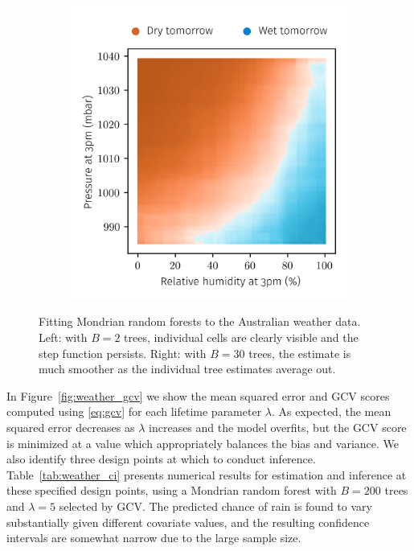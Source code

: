 \begin{figure}[ht]
\begin{subfigure}{0.49\textwidth}
    \includegraphics[scale=0.8]{graphics/weather_forest_30.png}%
  \end{subfigure}
  \caption{Fitting Mondrian random forests to the Australian weather data.
    Left: with $B=2$ trees, individual cells are clearly visible and the step
    function persists. Right: with $B=30$ trees, the estimate is much smoother
  as the individual tree estimates average out.}
  \label{fig:weather_forest}
\end{figure}

In Figure~\ref{fig:weather_gcv} we show the mean squared error
and GCV scores computed using \eqref{eq:gcv} for
each lifetime parameter $\lambda$. As expected, the mean squared error
decreases as $\lambda$ increases and the model overfits, but the GCV score 
is minimized
at a value which appropriately balances the bias and variance. We also
identify three design points at which to conduct inference.
Table~\ref{tab:weather_ci} presents numerical results for estimation and
inference at these specified design points, using a Mondrian random forest
with $B=200$ trees and $\lambda = 5$ selected by GCV.
The predicted chance of rain
is found to vary substantially given different covariate values,
and the resulting confidence intervals are somewhat narrow due to the
large sample size.

